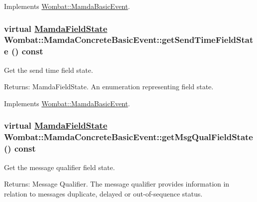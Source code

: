 Implements \hyperlink{classWombat_1_1MamdaBasicEvent_eb06352aca3280c5e89bad7a3b185cdf}{Wombat::Mamda\-Basic\-Event}.\hypertarget{classWombat_1_1MamdaConcreteBasicEvent_894b9605d54c499704d238e07c37cb79}{
\subsubsection[getSendTimeFieldState]{\setlength{\rightskip}{0pt plus 5cm}virtual \hyperlink{namespaceWombat_93aac974f2ab713554fd12a1fa3b7d2a}{Mamda\-Field\-State} Wombat::Mamda\-Concrete\-Basic\-Event::get\-Send\-Time\-Field\-State () const}}
\label{classWombat_1_1MamdaConcreteBasicEvent_894b9605d54c499704d238e07c37cb79}


Get the send time field state. 

\begin{Desc}
\item[Returns:]Mamda\-Field\-State. An enumeration representing field state. \end{Desc}


Implements \hyperlink{classWombat_1_1MamdaBasicEvent_418ecb29b412cd42581b54c87b5360fd}{Wombat::Mamda\-Basic\-Event}.\hypertarget{classWombat_1_1MamdaConcreteBasicEvent_aaf1398246904234d79b25d5a5c51873}{
\subsubsection[getMsgQualFieldState]{\setlength{\rightskip}{0pt plus 5cm}virtual \hyperlink{namespaceWombat_93aac974f2ab713554fd12a1fa3b7d2a}{Mamda\-Field\-State} Wombat::Mamda\-Concrete\-Basic\-Event::get\-Msg\-Qual\-Field\-State () const}}
\label{classWombat_1_1MamdaConcreteBasicEvent_aaf1398246904234d79b25d5a5c51873}


Get the message qualifier field state. 

\begin{Desc}
\item[Returns:]Message Qualifier. The message qualifier provides information in relation to messages duplicate, delayed or out-of-sequence status. \end{Desc}


